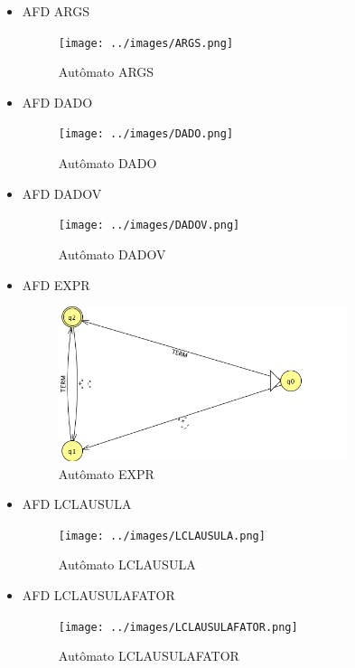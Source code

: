 \documentclass[12pt]{article}
\begin{document}
\begin{itemize}

\item AFD ARGS

\begin{figure}[H]
\centering 
\texttt{[image: ../images/ARGS.png]}  
\caption{Autômato ARGS}
\end{figure}

\item AFD DADO

\begin{figure}[H]
\centering 
\texttt{[image: ../images/DADO.png]}  
\caption{Autômato DADO}
\end{figure}

\item AFD DADOV

\begin{figure}[H]
\centering 
\texttt{[image: ../images/DADOV.png]}  
\caption{Autômato DADOV}
\end{figure}

\item AFD EXPR

\begin{figure}[H]
\centering 
\includegraphics[width=0.8\textwidth]{../images/EXPR.png}  
\caption{Autômato EXPR}
\end{figure}

\item AFD LCLAUSULA

\begin{figure}[H]
\centering 
\texttt{[image: ../images/LCLAUSULA.png]}  
\caption{Autômato LCLAUSULA}
\end{figure}

\item AFD LCLAUSULAFATOR

\begin{figure}[H]
\centering 
\texttt{[image: ../images/LCLAUSULAFATOR.png]}  
\caption{Autômato LCLAUSULAFATOR}
\end{figure}


\end{itemize}
\end{document}
